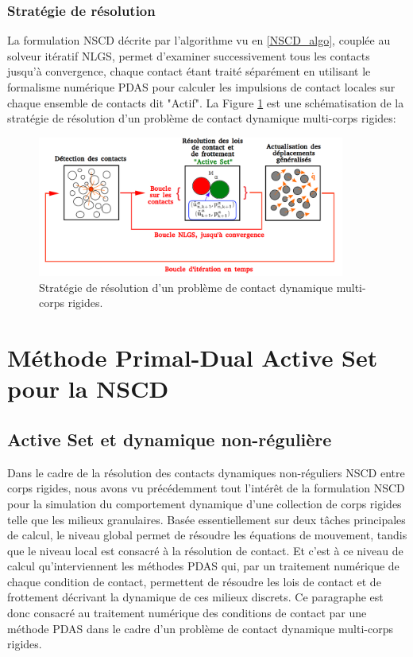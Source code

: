 \subsubsection{Stratégie de résolution}

La formulation NSCD décrite par l'algorithme vu en \ref{NSCD_algo}, couplée au solveur itératif NLGS, permet d'examiner successivement tous les contacts jusqu'à convergence, chaque contact étant traité séparément en utilisant le formalisme numérique PDAS pour calculer les impulsions de contact locales sur chaque ensemble de contacts dit "Actif". La Figure \ref{schema_nscd} est une schématisation de la stratégie de résolution d'un problème de contact dynamique multi-corps rigides:

\begin{figure}[!h]
  \centering
    \includegraphics[width=0.9\textwidth]{chapitres/chapitre_3/figures/nscd_resolution.png}
    \caption{\centering Stratégie de résolution d'un problème de contact dynamique multi-corps rigides.}\label{schema_nscd}
\end{figure}

\section{Méthode Primal-Dual Active Set pour la NSCD}\label{PDAS_4_NSCD}

\subsection{Active Set et dynamique non-régulière}

Dans le cadre de la résolution des contacts dynamiques non-réguliers NSCD entre corps rigides, nous avons vu précédemment tout l'intérêt de la formulation NSCD pour la simulation du comportement dynamique d'une collection de corps rigides telle que les milieux granulaires. Basée essentiellement sur deux tâches principales de calcul, le niveau global permet de résoudre les équations de mouvement, tandis que le niveau local est consacré à la résolution de contact. Et c'est à ce niveau de calcul qu'interviennent les méthodes PDAS qui, par un traitement numérique de chaque condition de contact, permettent de résoudre les lois de contact et de frottement décrivant la dynamique de ces milieux discrets. Ce paragraphe est donc consacré au traitement numérique des conditions de contact par une méthode PDAS dans le cadre d'un problème de contact dynamique multi-corps rigides.

